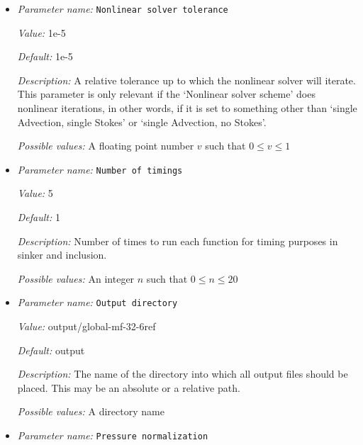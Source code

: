 \begin{itemize}
{\it Possible values:} Any one of single Advection, single Stokes, iterated Advection and Stokes, single Advection, iterated Stokes, no Advection, iterated Stokes, iterated Advection and Newton Stokes, single Advection, no Stokes, IMPES, iterated IMPES, iterated Stokes, Newton Stokes, Stokes only, Advection only, first timestep only, single Stokes, no Advection, no Stokes
\item {\it Parameter name:} {\tt Nonlinear solver tolerance}
\label{parameters:Nonlinear solver tolerance}
\label{parameters:Nonlinear_20solver_20tolerance}


{\it Value:} 1e-5


{\it Default:} 1e-5


{\it Description:} A relative tolerance up to which the nonlinear solver will iterate. This parameter is only relevant if the `Nonlinear solver scheme' does nonlinear iterations, in other words, if it is set to something other than `single Advection, single Stokes' or `single Advection, no Stokes'.


{\it Possible values:} A floating point number $v$ such that $0 \leq v \leq 1$
\item {\it Parameter name:} {\tt Number of timings}
\label{parameters:Number of timings}
\label{parameters:Number_20of_20timings}


{\it Value:} 5


{\it Default:} 1


{\it Description:} Number of times to run each function for timing purposes in sinker and inclusion.


{\it Possible values:} An integer $n$ such that $0\leq n \leq 20$
\item {\it Parameter name:} {\tt Output directory}
\label{parameters:Output directory}
\label{parameters:Output_20directory}


{\it Value:} output/global-mf-32-6ref


{\it Default:} output


{\it Description:} The name of the directory into which all output files should be placed. This may be an absolute or a relative path.


{\it Possible values:} A directory name
\item {\it Parameter name:} {\tt Pressure normalization}
\label{parameters:Pressure normalization}
\label{parameters:Pressure_20normalization}



\end{itemize}
